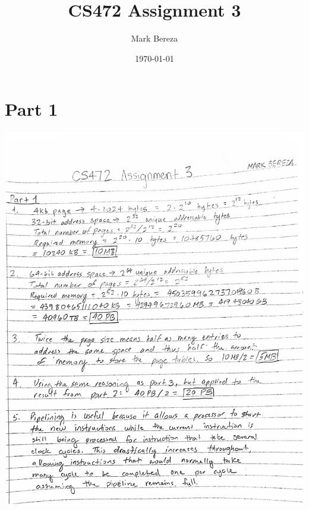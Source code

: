 \documentclass[12pt]{article}
\begin{document}
\title{CS472 Assignment 3}
\author{Mark Bereza}
\date{\today}
\maketitle

\section*{Part 1}
\includegraphics[width=\textwidth]{part11.eps}
\clearpage
\end{document}
